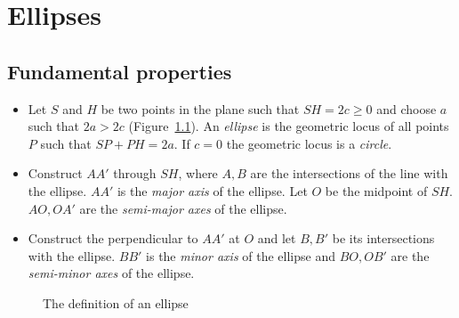 

\chapter{Ellipses}\label{s.ellipse}

\section{Fundamental properties}

\begin{definition}[Ellipse]\label{def.ellipse1}
\mbox{}
\begin{itemize}
\item Let $S$ and $H$ be two points in the plane such that $SH=2c\geq 0$ and choose $a$ such that $2a> 2c$ (Figure~\ref{f.ellipse-features1}). An \emph{ellipse} is the geometric locus of all points $P$ such that $SP+PH=2a$. If $c=0$ the geometric locus is a \emph{circle}.
\item Construct $AA'$ through $SH$, where $A,B$ are the intersections of the line with the ellipse. $AA'$ is  the \emph{major axis} of the ellipse. Let $O$ be the midpoint of $SH$. $AO,OA'$ are the \emph{semi-major axes} of the ellipse.
\item Construct the perpendicular to $AA'$ at $O$ and let $B,B'$ be its intersections with the ellipse. $BB'$ is the \emph{minor axis} of the ellipse and $BO,OB'$ are the \emph{semi-minor axes} of the ellipse.
\end{itemize}
\end{definition}


\begin{figure}[b]
\begin{center}
\caption{The definition of an ellipse}\label{f.ellipse-features1}
\end{center}
\end{figure}

